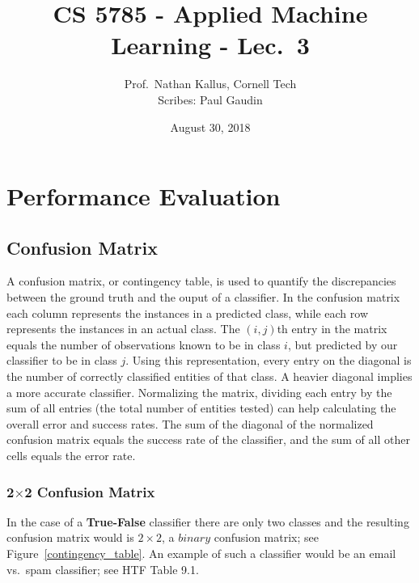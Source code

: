 \documentclass[a4paper]{article}
\title{CS 5785 - Applied Machine Learning - Lec.\ 3}
\author{Prof.\ Nathan Kallus, Cornell Tech\\Scribes: Paul Gaudin }
\date{August 30, 2018}
\begin{document}
\maketitle

\section{Performance Evaluation}

\subsection{Confusion Matrix}


A confusion matrix, or contingency table, is used to quantify the discrepancies between the ground truth and the ouput of a classifier. In the confusion matrix each column represents the instances in a predicted class, while each row represents the instances in an actual class. The $(i,j)$th entry in the matrix equals the number of observations known to be in class $i$, but predicted by our classifier to be in class $j$. Using this representation, every entry on the diagonal is the number of correctly classified entities of that class. A heavier diagonal implies a more accurate classifier.
Normalizing the matrix, dividing each entry by the sum of all entries (the total number of entities tested) can help calculating the overall error and success rates. The sum of the diagonal of the normalized confusion matrix equals the success rate of the classifier, and the sum of all other cells equals the error rate.
\subsubsection{2$\times$2 Confusion Matrix}
In the case of a \textbf{True-False} classifier there are only two classes and the resulting confusion matrix would is $2\times 2$, a $binary$ confusion matrix; see Figure~\ref{contingency_table}. An example of such a classifier would be an email vs.\ spam classifier; see HTF Table 9.1.
\end{document}
